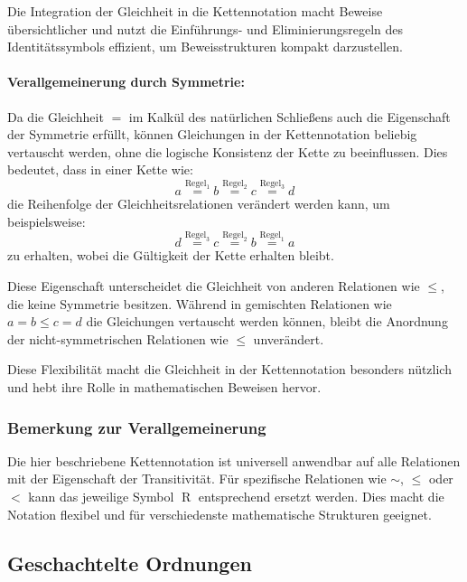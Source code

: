 \documentclass[main.tex]{subfiles}
\begin{document}
Die Integration der Gleichheit in die Kettennotation macht Beweise übersichtlicher und nutzt die Einführungs- und Eliminierungsregeln des Identitätssymbols effizient, um Beweisstrukturen kompakt darzustellen.

\paragraph{Verallgemeinerung durch Symmetrie:}  
Da die Gleichheit \(=\) im Kalkül des natürlichen Schließens auch die Eigenschaft der Symmetrie erfüllt, können Gleichungen in der Kettennotation beliebig vertauscht werden, ohne die logische Konsistenz der Kette zu beeinflussen. Dies bedeutet, dass in einer Kette wie:
\[
a \stackrel{\text{Regel}_1}{=} b \stackrel{\text{Regel}_2}{=} c \stackrel{\text{Regel}_3}{=} d
\]
die Reihenfolge der Gleichheitsrelationen verändert werden kann, um beispielsweise:
\[
d \stackrel{\text{Regel}_3}{=} c \stackrel{\text{Regel}_2}{=} b \stackrel{\text{Regel}_1}{=} a
\]
zu erhalten, wobei die Gültigkeit der Kette erhalten bleibt.

Diese Eigenschaft unterscheidet die Gleichheit von anderen Relationen wie \(\leq\), die keine Symmetrie besitzen. Während in gemischten Relationen wie \(a = b \leq c = d\) die Gleichungen vertauscht werden können, bleibt die Anordnung der nicht-symmetrischen Relationen wie \(\leq\) unverändert. 

Diese Flexibilität macht die Gleichheit in der Kettennotation besonders nützlich und hebt ihre Rolle in mathematischen Beweisen hervor.

\subsubsection*{Bemerkung zur Verallgemeinerung}

Die hier beschriebene Kettennotation ist universell anwendbar auf alle Relationen mit der Eigenschaft der Transitivität. Für spezifische Relationen wie \(\sim\), \(\leq\) oder \(<\) kann das jeweilige Symbol \(\mathrel{R}\) entsprechend ersetzt werden. Dies macht die Notation flexibel und für verschiedenste mathematische Strukturen geeignet.

\subsection{Geschachtelte Ordnungen}
\end{document}
